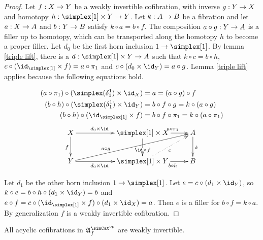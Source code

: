 \documentclass[csh.tex]{subfiles}
\begin{document}
\begin{proof} Let $f: X\to Y$ be a weakly invertible cofibration, with inverse $g: Y\to X$ and homotopy $h\of\simplex[1]\times Y\to Y$. Let $k: A\to B$ be a fibration and let $a: X\to A$ and $b: Y\to B$ satisfy $k\circ a=b\circ f$. The composition $a\circ g: Y\to A$ is a filler up to homotopy, which can be transported along the homotopy $h$ to become a proper filler. Let $d_0$ be the first horn inclusion $1\to \simplex[1]$. By lemma \ref{triple lift}, there is a $d\of \simplex[1]\times Y\to A$ such that $k\circ c=b\circ h$, $c\circ (\id_{\simplex[1]}\times f)= a\circ \pi_1$ and $c\circ (d_0\times \id_Y) = a\circ g$.
Lemma \ref{triple lift} applies because the following equations hold.

\begin{align*} 
	(a\circ \pi_1)\circ (\simplex(\delta^1_1)\times\id_X) &= a = (a\circ g)\circ f\\
	(b\circ h)\circ (\simplex(\delta^1_1)\times\id_Y) &= b\circ f\circ g = k\circ (a\circ g)\\
	(b\circ h)\circ (\id_{\simplex[1]}\times f) &= b\circ f\circ \pi_1 = k\circ (a\circ \pi_1)
\end{align*}
\[\xymatrix{
X\ar[d]_f \ar[rr]^(.4){d_0\times \id} && \simplex[1]\times X \ar[d]|(.6){\id\times f}\ar[r]^(.6){a\circ \pi_1} & A\ar[d]^k\\
Y \ar[rr]_(.4){d_0\times \id}\ar[urrr]^(.3){a\circ g} && \simplex[1]\times Y\ar[r]_(.6){b\circ h}\ar@{.>}[ur]_c & B
}\]

Let $d_1$ be the other horn inclusion $1\to \simplex[1]$. Let $e=c\circ(d_1\times \id_Y)$, so $k\circ e=b\circ h\circ (d_1\times \id_Y) = b$ and $e\circ f = c\circ (\id_{\simplex[1]}\times f)\circ (d_1\times \id_X) = a$. Then $e$ is a filler for $b\circ f=k\circ a$. By generalization $f$ is a weakly invertible cofibration.
\end{proof}

\begin{lemma} All acyclic cofibrations in $\ambient\s\f$ are weakly invertible.\label{lifting is acyclic} \end{lemma}
\end{document}

